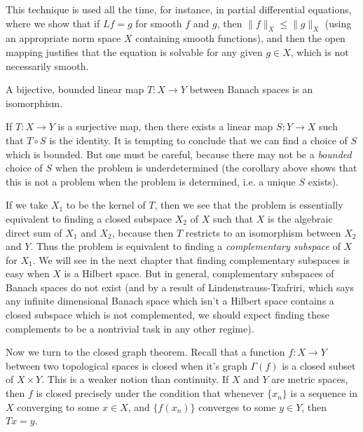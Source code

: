 This technique is used all the time, for instance, in partial differential equations, where we show that if $Lf = g$ for smooth $f$ and $g$, then $\| f \|_X \leq \| g \|_X$ (using an appropriate norm space $X$ containing smooth functions), and then the open mapping justifies that the equation is solvable for any given $g \in X$, which is not necessarily smooth.

\begin{corollary}
    A bijective, bounded linear map $T: X \to Y$ between Banach spaces is an isomorphism.
\end{corollary}

If $T: X \to Y$ is a surjective map, then there exists a linear map $S: Y \to X$ such that $T \circ S$ is the identity. It is tempting to conclude that we can find a choice of $S$ which is bounded. But one must be careful, because there may not be a \emph{bounded} choice of $S$ when the problem is underdetermined (the corollary above shows that this is not a problem when the problem is determined, i.e. a unique $S$ exists).

If we take $X_1$ to be the kernel of $T$, then we see that the problem is essentially equivalent to finding a closed subspace $X_2$ of $X$ such that $X$ is the algebraic direct sum of $X_1$ and $X_2$, because then $T$ restricts to an isomorphism between $X_2$ and $Y$. Thus the problem is equivalent to finding a \emph{complementary subspace} of $X$ for $X_1$. We will see in the next chapter that finding complementary subspaces is easy when $X$ is a Hilbert space. But in general, complementary subspaces of Banach spaces do not exist (and by a result of Lindenstrauss-Tzafriri, which says any infinite dimensional Banach space which isn't a Hilbert space contains a closed subspace which is not complemented, we should expect finding these complements to be a nontrivial task in any other regime).

Now we turn to the closed graph theorem. Recall that a function $f: X \to Y$ between two topological spaces is closed when it's graph $\Gamma(f)$ is a closed subset of $X \times Y$. This is a weaker notion than continuity. If $X$ and $Y$ are metric spaces, then $f$ is closed precisely under the condition that whenever $\{ x_n \}$ is a sequence in $X$ converging to some $x \in X$, and $\{ f(x_n) \}$ converges to some $y \in Y$, then $Tx = y$.

